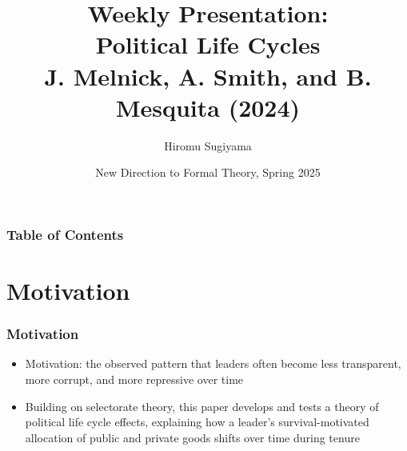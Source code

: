 \documentclass[10pt,handout]{beamer}
\title[Weekly Presentation] %
{Weekly Presentation: \\
Political Life Cycles \\
J. Melnick, A. Smith, and B. Mesquita (2024)}
\author[Hiromu Sugiyama] %
{Hiromu Sugiyama}
\date[April 8th, 2025] %
{New Direction to Formal Theory, Spring 2025}
\begin{document}
\frame{\titlepage}


\begin{frame}
\frametitle{Table of Contents}
\tableofcontents
\end{frame}

\section{Motivation}
\begin{frame}
\frametitle{Motivation}
\begin{itemize}
    \item Motivation: the observed pattern that leaders often become less transparent, more corrupt, and more repressive over time
    \item Building on selectorate theory, this paper develops and tests a theory of political life cycle effects, explaining how a leader’s survival-motivated allocation of public and private goods shifts over time during tenure
\end{itemize}
\end{frame}
\end{document}
